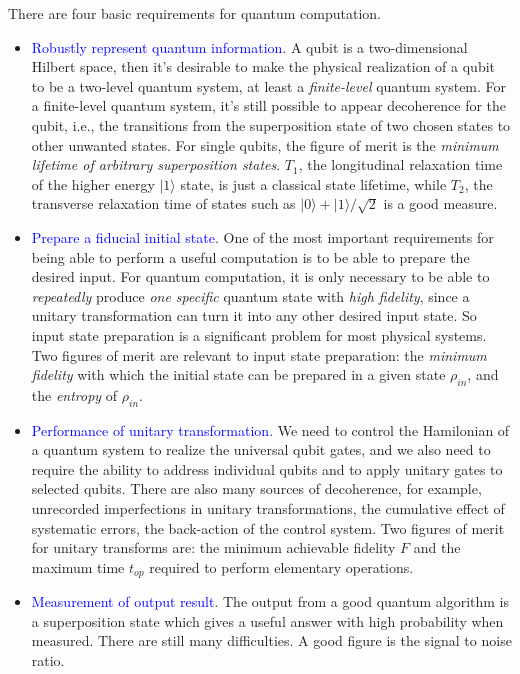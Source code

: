 \documentclass{article}
\newcommand{\ket}[1]{| #1 \rangle}  %
\begin{document}
There are four basic requirements for quantum computation.
\begin{itemize}
	\item \textcolor{blue}{Robustly represent quantum information}. A qubit is a two-dimensional Hilbert space, then it's desirable to make the physical realization of a qubit to be a two-level quantum system, at least a \textit{finite-level} quantum system. For a finite-level quantum system, it's still possible to appear decoherence for the qubit, i.e., the transitions from the superposition state of two chosen states to other unwanted states. For single qubits, the figure of merit is the \textit{minimum lifetime of arbitrary superposition states}. $T_1$, the longitudinal relaxation time of the higher energy $\ket{1}$ state, is just a classical state lifetime, while $T_2$, the transverse relaxation time of states such as $\ket{0}+\ket{1}/\sqrt{2}$ is a good measure.
	
	\item \textcolor{blue}{Prepare a fiducial initial state}. One of the most important requirements for being able to perform a useful computation is to be able to prepare the desired input. For quantum computation, it is only necessary to be able to \textit{repeatedly} produce \textit{one specific} quantum state with \textit{high fidelity}, since a unitary transformation can turn it into any other desired input state. So input state preparation is a significant problem for most physical systems. Two figures of merit are relevant to input state preparation: the \textit{minimum fidelity} with which the initial state can be prepared in a given state $\rho_{in}$, and the \textit{entropy} of $\rho_{in}$.
	
	\item \textcolor{blue}{Performance of unitary transformation}. We need to control the Hamilonian of a quantum system to realize the universal qubit gates, and we also need to require the ability to address individual qubits and to apply unitary gates to selected qubits. There are also many sources of decoherence, for example, unrecorded imperfections in unitary transformations, the cumulative effect of systematic errors, the back-action of the control system. Two figures of merit for unitary transforms are: the minimum achievable fidelity $F$ and the maximum time $t_{op}$ required to perform elementary operations.
	
	\item \textcolor{blue}{Measurement of output result}. The output from a good quantum algorithm is a superposition state which gives a useful answer with high probability when measured. There are still many difficulties. A good  figure is the signal to noise ratio.
	
	
\end{itemize}
\end{document}
